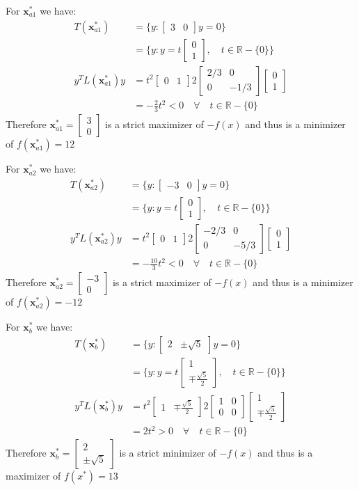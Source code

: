 \documentclass[a4paper,11pt]{article}
\newcommand{\V}[1]{\boldsymbol{#1}}
\newcommand{\mat}[1]{\begin{bmatrix}#1\end{bmatrix}}
\begin{document}
\noindent For $\V{x}^*_{a1}$ we have:
\begin{align*}
  T(\V{x}^*_{a1})&=  \{y: \mat{3& 0}y = 0   \}\\
& =  \{y:  y=t\mat{0\\ 1},\quad t\in\mathbb{R} -\{0\}   \}\\
y^TL(\V{x}^*_{a1})y &= t^2 \mat{0&1} 2\mat{2/3& 0\\0& -1/3} \mat{0\\1}\\
&= -\frac{2}{3}t^2< 0 \quad \forall \quad t\in\mathbb{R}-\{0\}
\end{align*}
Therefore $\V{x}^*_{a1} =\mat{3\\0}$ is a strict maximizer of $-f(x)$ and thus is a minimizer of $f(\V{x}^*_{a1})=12$

\noindent For $\V{x}^*_{a2}$ we have:
\begin{align*}
  T(\V{x}^*_{a2})&=  \{y: \mat{-3& 0}y = 0   \}\\
& =  \{y:  y=t\mat{0\\ 1},\quad t\in\mathbb{R} -\{0\}   \}\\
y^TL(\V{x}^*_{a2})y &= t^2 \mat{0&1} 2\mat{-2/3& 0\\0& -5/3} \mat{0\\1}\\
&= -\frac{10}{3}t^2< 0 \quad \forall \quad t\in\mathbb{R}-\{0\}
\end{align*}
Therefore $\V{x}^*_{a2} =\mat{-3\\0}$ is a strict maximizer of $-f(x)$ and thus is a minimizer of $f(\V{x}^*_{a2})=-12$

\noindent For $\V{x}^*_b$ we have:
\begin{align*}
  T(\V{x}^*_b)&=  \{y: \mat{2& \pm\sqrt{5}}y = 0   \}\\
& =  \{y:  y=t\mat{1\\ \mp\frac{\sqrt{5}}{2}} ,\quad t\in\mathbb{R} -\{0\}  \}\\
y^TL(\V{x}^*_b)y &= t^2 \mat{1& \mp\frac{\sqrt{5}}{2}} 2\mat{1& 0\\0& 0} \mat{1\\ \mp\frac{\sqrt{5}}{2}}\\
&= 2t^2> 0 \quad \forall \quad t\in\mathbb{R}-\{0\}
\end{align*}
Therefore $\V{x}^*_b =\mat{2\\ \pm \sqrt{5}}$ is a strict minimizer of $-f(x)$ and thus is a maximizer of $f(x^*)=13$

\clearpage
\vspace{2ex}
\end{document}
